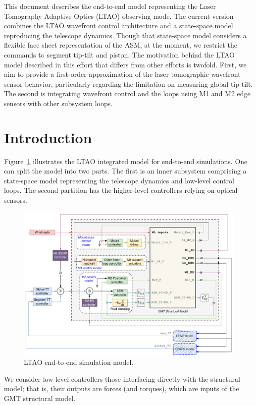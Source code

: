\documentclass{gmto}
\begin{document}
This document describes the end-to-end model representing the Laser Tomography Adaptive Optics (LTAO) observing mode. The current version combines the LTAO wavefront control architecture and a state-space model reproducing the telescope dynamics. Though that state-space model considers a flexible face sheet representation of the ASM, at the moment, we restrict the commands to segment tip-tilt and piston. The motivation behind the LTAO model described in this effort that differs from other efforts is twofold. First, we aim to provide a first-order approximation of the laser tomographic wavefront sensor behavior, particularly regarding the limitation on measuring global tip-tilt. The second is integrating wavefront control and the loops using M1 and M2 edge sensors with other subsystem loops.


\section{Introduction}
\label{sec:introduction}

Figure~\ref{fig:ltaoIM} illustrates the LTAO integrated model for end-to-end simulations. One can split the model into two parts. The first is an inner subsystem comprising a state-space model representing the telescope dynamics and low-level control loops. The second partition has the higher-level controllers relying on optical sensors. 
%
\begin{figure}[!hbt]
    \centering
    \includegraphics[width=\textwidth]{../ltao_e2e-main.pdf}
    \caption{LTAO end-to-end simulation model.}
    \label{fig:ltaoIM}
\end{figure}
%
We consider low-level controllers those interfacing directly with the structural model; that is, their outputs are forces (and torques), which are inputs of the GMT structural model.
\end{document}
